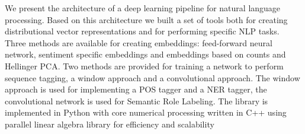 We present the architecture of a deep learning pipeline for natural language processing. Based on this architecture we built a set of tools both for creating distributional vector representations and for performing specific NLP tasks. Three methods are available for creating embeddings: feed-forward neural network, sentiment specific embeddings and embeddings based on counts and Hellinger PCA. Two methods are provided for training a network to perform sequence tagging, a window approach and a convolutional approach. The window approach is used for implementing a POS tagger and a NER tagger, the convolutional network is used for Semantic Role Labeling. The library is implemented in Python with core numerical processing written in C++ using parallel linear algebra library for efficiency and scalability
